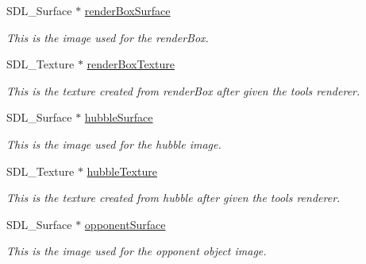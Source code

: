 \begin{DoxyCompactItemize}
S\+D\+L\+\_\+\+Surface $\ast$ \mbox{\hyperlink{class_resource_manager_a0e0b66dfe90518eb1fc03ec90fc72c0e}{render\+Box\+Surface}}
\begin{DoxyCompactList}\small\item\em This is the image used for the render\+Box. \end{DoxyCompactList}\item 
\mbox{\label{class_resource_manager_adabfddc4144a11f7a406e09abc0b6cb4}} 
S\+D\+L\+\_\+\+Texture $\ast$ \mbox{\hyperlink{class_resource_manager_adabfddc4144a11f7a406e09abc0b6cb4}{render\+Box\+Texture}}
\begin{DoxyCompactList}\small\item\em This is the texture created from render\+Box after given the tool\textquotesingle{}s renderer. \end{DoxyCompactList}\item 
\mbox{\label{class_resource_manager_ae36ba5f64dd2296a073ccec35e9ad8a9}} 
S\+D\+L\+\_\+\+Surface $\ast$ \mbox{\hyperlink{class_resource_manager_ae36ba5f64dd2296a073ccec35e9ad8a9}{hubble\+Surface}}
\begin{DoxyCompactList}\small\item\em This is the image used for the hubble image. \end{DoxyCompactList}\item 
\mbox{\label{class_resource_manager_acb9dd6572ea6790298861a370db99cd7}} 
S\+D\+L\+\_\+\+Texture $\ast$ \mbox{\hyperlink{class_resource_manager_acb9dd6572ea6790298861a370db99cd7}{hubble\+Texture}}
\begin{DoxyCompactList}\small\item\em This is the texture created from hubble after given the tool\textquotesingle{}s renderer. \end{DoxyCompactList}\item 
\mbox{\label{class_resource_manager_a982f9fce6da6119cd4e07a8fcf36700b}} 
S\+D\+L\+\_\+\+Surface $\ast$ \mbox{\hyperlink{class_resource_manager_a982f9fce6da6119cd4e07a8fcf36700b}{opponent\+Surface}}
\begin{DoxyCompactList}\small\item\em This is the image used for the opponent object image. \end{DoxyCompactList}\item 

\end{DoxyCompactItemize}
